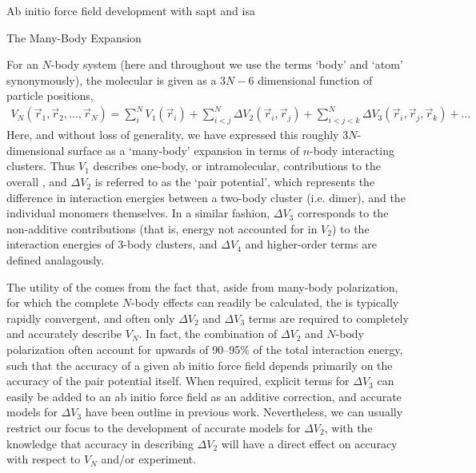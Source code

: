 \begin{section}{Ab initio force field development with \acrshort{sapt} and
\acrshort{isa}}
\begin{subsection}{The Many-Body Expansion}
\label{sec:intro-mbe}


For an $N$-body system (here and throughout we use the terms `body' and `atom'
synonymously), the molecular \pes is given as a $3N-6$ 
dimensional function of particle positions,
\cite{Stone2007,Cieplak2009,McDaniel2014,Elrodt1997}
%
\begin{align}
V_N(\vec r_1 ,\vec r_2 ,\dots,\vec r_N ) =
    \sum\limits_{i}^{N} V_1(\vec r_i) +
    \sum\limits_{i < j}^{N} \Delta V_2(\vec r_i, \vec r_j) +
    \sum\limits_{i < j < k}^{N} \Delta V_3(\vec r_i, \vec r_j, \vec r_k) +
\dots
\end{align}
%
Here, and without loss of generality, we have expressed this roughly $3N$-dimensional
surface as a `many-body' expansion in terms of $n$-body interacting clusters.
Thus $V_1$ describes one-body, or intramolecular, contributions to the overall
\pes, and $\Delta V_2$ is referred to as the `pair potential', which represents the
difference in interaction energies between a two-body cluster (i.e. dimer), and the
individual monomers themselves. In a similar fashion,
$\Delta V_3$ corresponds to
the non-additive contributions (that is, energy not accounted for
in $V_2$) to the interaction energies of 3-body clusters, and $\Delta V_4$ and
higher-order terms are defined analagously. 

The utility of the \mbe comes from the fact that, aside from 
many-body polarization, for which the complete $N$-body effects can readily be
calculated,\cite{Stone2007,Rick2002} the \mbe is typically
rapidly convergent, and often only $\Delta V_2$ and
 $\Delta V_3$ terms are required to completely and accurately describe
$V_N$.\cite{Stone2007,stone2013theory} In fact, the combination of $\Delta
V_2$ and $N$-body polarization often account for
upwards of 90--95\%
of the total interaction energy,
\cite{McDaniel2014,stone2013theory}
such that the accuracy of a given ab initio force field depends primarily on
the accuracy of the pair potential itself. 
When
required, explicit terms for 
$\Delta V_3$ can easily be added to an ab initio force field as an additive
correction, and accurate models for  $\Delta V_3$ have been outline in
previous work.
\cite{McDaniel2014}
Nevertheless,
we can usually restrict our focus to the development of accurate models for $\Delta
V_2$, with the knowledge that accuracy in describing $\Delta V_2$ will have a
direct effect on accuracy with respect to $V_N$ and/or experiment. 



\end{subsection}
\end{section}
